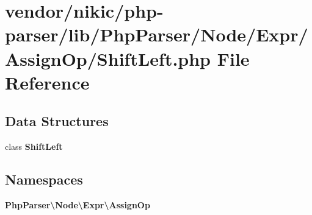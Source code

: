 \section{vendor/nikic/php-\/parser/lib/\+Php\+Parser/\+Node/\+Expr/\+Assign\+Op/\+Shift\+Left.php File Reference}
\label{_assign_op_2_shift_left_8php}
\subsection*{Data Structures}
\begin{DoxyCompactItemize}
\item 
class {\bf Shift\+Left}
\end{DoxyCompactItemize}
\subsection*{Namespaces}
\begin{DoxyCompactItemize}
\item 
 {\bf Php\+Parser\textbackslash{}\+Node\textbackslash{}\+Expr\textbackslash{}\+Assign\+Op}
\end{DoxyCompactItemize}
